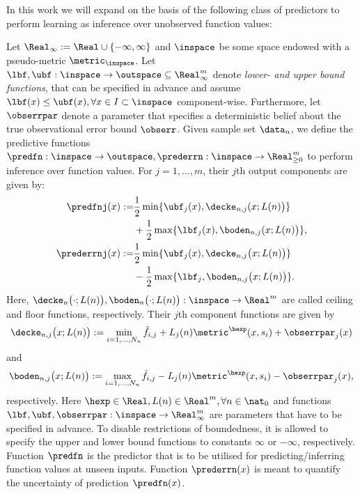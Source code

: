 In this work we will expand on the basis of the following class of predictors to perform learning as inference over unobserved function values:

\begin{defn} \label{def:KIL}
Let  $\Real_\infty := \Real \cup\{- \infty, \infty\}$ and $\inspace$ be some space endowed with a pseudo-metric $\metric_\inspace$. Let $\lbf,\ubf: \inspace \to \outspace \subseteq \Real_\infty^m$ denote \textit{lower- and upper bound functions}, that can be specified in advance and assume $\lbf(x) \leq \ubf(x), \forall x \in I \subset \inspace$ component-wise. 
Furthermore, let $\obserrpar$ denote a parameter that specifies a deterministic belief about the true observational error bound $\obserr$.
Given sample set $\data_n$, we define the predictive functions $\predfn: \inspace \to \outspace, \prederrn: \inspace \to \Real^m_{\geq 0}$ to perform inference over function values.
For $j=1,\ldots,m$, their $j$th output components are given by:
	\begin{align*}
   \predfnj(x) :=& \frac{1}{2} \min\{ \ubf_j(x), \decke_{n,j}(x;L(n)\bigr)\} \\
    &+ \frac{1}{2} \max\{ \lbf_j(x), \boden_{n,j}(x;L(n)\bigr) \},\\
	\prederrnj(x) :=& \frac{1}{2} \min\{ \ubf_j(x), \decke_{n,j}\bigl(x;L(n)\bigr)\} \\
	&- \frac{1}{2} \max\{ \lbf_j, \boden_{n,j}\bigl(x;L(n)\bigr) \}.
	\end{align*}
	Here, $\decke_n\bigl(\cdot;L(n)\bigr), \boden_n\bigl(\cdot;L(n)\bigr): \inspace \to \Real^m$ are called ceiling and floor functions, respectively. Their $j$th component functions are given by
	\[\decke_{n,j}\bigl(x; L(n)\bigr) := \min_{i=1,\ldots,N_n}   \tilde f_{i,j} + L_j(n) \metric^\hexp(x,s_i) + \obserrpar_j(x)\] and 
	\[\boden_{n,j}\bigl(x; L(n)\bigr) := \max_{i=1,\ldots,N_n}   \tilde f_{i,j} - L_j(n) \metric^\hexp(x,s_i) - \obserrpar_j(x),\] respectively.
  Here $\hexp \in \Real, L(n) \in \Real^m, \forall n \in \nat_0$ and functions $\lbf,\ubf,\obserrpar:  \inspace \to \Real_\infty^m$ are parameters that have to be specified in advance. To disable restrictions of boundedness, it is allowed to specify the upper and lower bound functions to constants $\infty$ or $-\infty$, respectively.	
	Function $\predfn$ is the predictor that is to be utilised for predicting/inferring function values at unseen inputs. Function $\prederrn(x)$ is meant to quantify the uncertainty of prediction $\predfn(x)$. 
\end{defn}

